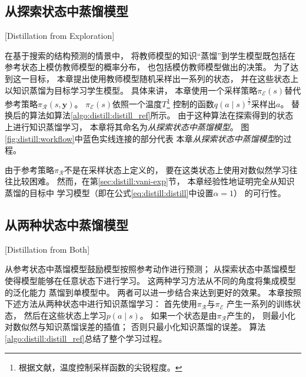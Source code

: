 
\subsection{从探索状态中蒸馏模型}[Distillation from Exploration]\label{sec:distill:distill_explore}

在基于搜索的结构预测的情景中，
将教师模型的知识``蒸馏''到学生模型既包括在参考状态上模仿教师模型的概率分布，
也包括模仿教师模型做出的决策。
为了达到这一目标，
本章提出使用教师模型随机采样出一系列的状态，
并在这些状态上以知识蒸馏为目标学习学生模型。
具体来讲，
本章使用一个采样策略$\pi_\mathcal{E}(s)$替代参考策略$\pi_\mathcal{R}(s, \mathbf{y})$。
$\pi_\mathcal{E}(s)$依照一个温度$T$\footnote{
	根据文献，温度控制采样函数的尖锐程度。}
控制的函数$q(a\mid s)^{\frac{1}{T}}$采样出$a$。
替换后的算法如算法\ref{algo:distill:distill_ref}所示。
由于这种算法在探索得到的状态上进行知识蒸馏学习，
本章将其命名为\textit{从探索状态中蒸馏模型}。
图\ref{fig:distill:workflow}中蓝色实线连接的部分代表
本章\textit{从探索状态中蒸馏模型}的过程。

由于参考策略$\pi_\mathcal{R}$不是在采样状态上定义的，
要在这类状态上使用对数似然学习往往比较困难。
然而，在第\ref{sec:distill:vani-exp}节，
本章经验性地证明完全从知识蒸馏的目标中
学习模型（即在公式\ref{eq:distill:distill}中设置$\alpha = 1$）
的可行性。

\subsection{从两种状态中蒸馏模型}[Distillation from Both]\label{sec:distill_both}

从参考状态中蒸馏模型鼓励模型按照参考动作进行预测；
从探索状态中蒸馏模型使得模型能够在任意状态下进行学习。
这两种学习方法从不同的角度将集成模型的泛化能力
蒸馏到单模型中。
两者可以进一步结合来达到更好的效果。
本章按照下述方法从两种状态中进行知识蒸馏学习：
首先使用$\pi_\mathcal{R}$与$\pi_\mathcal{E}$
产生一系列的训练状态，
然后在这些状态上学习$p(a \mid s)$。
如果一个状态是由$\pi_\mathcal{R}$产生的，
则最小化对数似然与知识蒸馏误差的插值；
否则只最小化知识蒸馏的误差。
算法\ref{algo:distill:distill_ref}总结了整个学习过程。

